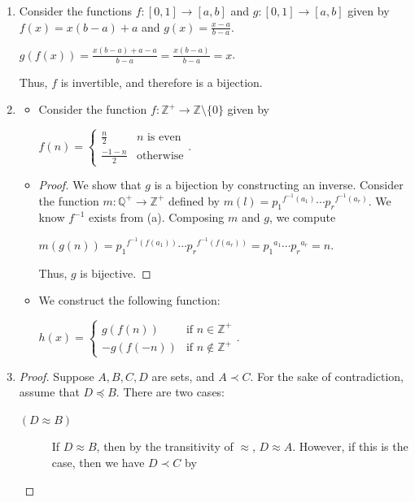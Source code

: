\documentclass[12pt]{article}
\begin{document}
\begin{enumerate}[start = 1, label = {\bfseries Question \arabic*}, leftmargin=1in]
\item Consider the functions $f:[0,1]\to [a,b]$ and $g:[0,1]\to [a,b]$ given by $f(x)=x(b-a)+a$ and $g(x)=\frac{x-a}{b-a}$.\begin{center}
    $g(f(x))=\frac{x(b-a)+a-a}{b-a}=\frac{x(b-a)}{b-a}=x$.
\end{center} Thus, $f$ is invertible, and therefore is a bijection.
\item \begin{itemize}
    \item[(a)] Consider the function $f:\mathbb{Z}^{+} \to \mathbb{Z}\setminus \{0\}$ given by \begin{center}$f(n) = \begin{cases}
        \frac{n}{2} & n \text{ is even}\\
        \frac{-1-n}{2} & \text{otherwise}
    \end{cases}$.
    \end{center}
    \item[(b)] \begin{proof}
    We show that $g$ is a bijection by constructing an inverse. Consider the function $m:\mathbb{Q}^{+}\to \mathbb{Z}^{+}$ defined by $m(l) = {p_1}^{f^{-1}(a_1)}\cdots {p_r}^{f^{-1}(a_r)}$. We know $f^{-1}$ exists from (a). Composing 
    $m$ and $g$, we compute\begin{center}
        $m(g(n))={p_1}^{f^{-1}(f(a_1))}\cdots{p_r}^{f^{-1}(f(a_r))}={p_1}^{a_1}\cdots{p_r}^{a_r}=n$.
    \end{center} Thus, $g$ is bijective.
    \end{proof}
    \item[(c)] We construct the following function:\begin{center}
        $h(x)=\begin{cases}
            g(f(n)) & \text{if } n\in\mathbb{Z}^{+}\\
            -g(f(-n)) & \text{if } n\not\in\mathbb{Z}^{+}
        \end{cases}$.
    \end{center}
\end{itemize}
\item\begin{proof}
    Suppose $A,B,C,D$ are sets, and $A\prec C$. For the sake of contradiction, assume that $D\preccurlyeq B$. There are two cases:\begin{description}
        \item[$(D\approx B)$] If $D\approx B$, then by the transitivity of $\approx$,  $D\approx A$. However, if this is the case, then we have $D\prec C$ by

\end{description}
\end{proof}
\end{enumerate}
\end{document}
